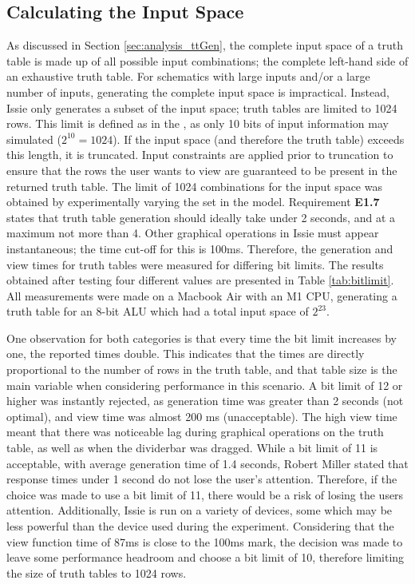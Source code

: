 \subsection{Calculating the Input Space}
As discussed in Section \ref{sec:analysis_ttGen}, the complete input space of a truth table is made up of all possible input combinations; the complete left-hand side of an exhaustive truth table. For schematics with large inputs and/or a large number of inputs, generating the complete input space is impractical. Instead, Issie only generates a subset of the input space; truth tables are limited to 1024 rows. This limit is defined as in the , as only 10 bits of input information may simulated ($2^{10} = 1024$). If the input space (and therefore the truth table) exceeds this length, it is truncated. Input constraints are applied prior to truncation to ensure that the rows the user wants to view are guaranteed to be present in the returned truth table.
The limit of 1024 combinations for the input space was obtained by experimentally varying the set  in the model. Requirement \textbf{E1.7} states that truth table generation should ideally take under 2 seconds, and at a maximum not more than 4. Other graphical operations in Issie must appear instantaneous; the time cut-off for this is 100ms. Therefore, the generation and view times for truth tables were measured for differing bit limits. The results obtained after testing four different values are presented in Table \ref{tab:bitlimit}. All measurements were made on a Macbook Air with an M1 CPU, generating a truth table for an 8-bit ALU which had a total input space of $2^{23}$. 

One observation for both categories is that every time the bit limit increases by one, the reported times double. This indicates that the times are directly proportional to the number of rows in the truth table, and that table size is the main variable when considering performance in this scenario. A bit limit of 12 or higher was instantly rejected, as generation time was greater than 2 seconds (not optimal), and view time was almost 200 ms (unacceptable). The high view time meant that there was noticeable lag during graphical operations on the truth table, as well as when the dividerbar was dragged. While a bit limit of 11 is acceptable, with average generation time of 1.4 seconds, Robert Miller \cite{Miller1968ResponseTI} stated that response times under 1 second do not lose the user's attention. Therefore, if the choice was made to use a bit limit of 11, there would be a risk of losing the users attention. Additionally, Issie is run on a variety of devices, some which may be less powerful than the device used during the experiment. Considering that the view function time of 87ms is close to the 100ms mark, the decision was made to leave some performance headroom and choose a bit limit of 10, therefore limiting the size of truth tables to 1024 rows.


